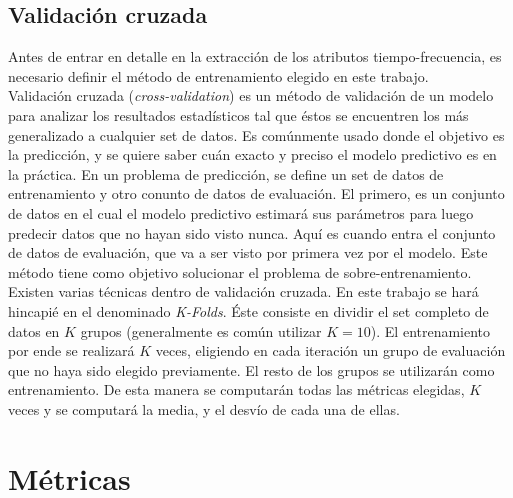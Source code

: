 \subsection*{Validación cruzada} \label{subsec:cross-validation}

\indent Antes de entrar en detalle en la extracción de los atributos tiempo-frecuencia, es necesario definir el
método de entrenamiento elegido en este trabajo. \\
\indent Validación cruzada (\textit{cross-validation}) es un método de validación de un modelo para analizar los
resultados estadísticos tal que éstos se encuentren los más generalizado a cualquier set de datos. Es comúnmente
usado donde el objetivo es la predicción, y se quiere saber cuán exacto y preciso el modelo predictivo es en la
práctica. En un problema de predicción, se define un set de datos de entrenamiento y otro conunto de datos de
evaluación. El primero, es un conjunto de datos en el cual el modelo predictivo estimará sus parámetros para luego
predecir datos que no hayan sido visto nunca. Aquí es cuando entra el conjunto de datos de evaluación, que va a ser
visto por primera vez por el modelo. Este método tiene como objetivo solucionar el problema de sobre-entrenamiento. \\
\indent Existen varias técnicas dentro de validación cruzada. En este trabajo se hará hincapié en el denominado
\textit{K-Folds}. Éste consiste en dividir el set completo de datos en $K$ grupos (generalmente es común utilizar $K
= 10$). El entrenamiento por ende se realizará $K$ veces, eligiendo en cada iteración un grupo de evaluación que no
haya sido elegido previamente. El resto de los grupos se utilizarán como entrenamiento. De esta manera se computarán
todas las métricas elegidas, $K$ veces y se computará la media, y el desvío de cada una de ellas.

\section{Métricas} \label{sec:metrics}

